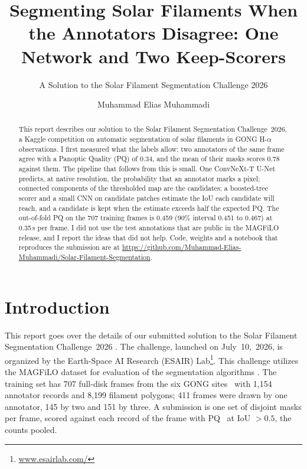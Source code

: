 \documentclass[sigconf]{acmart}
\begin{document}
\title[One Network and Two Keep-Scorers]{Segmenting Solar Filaments When the Annotators Disagree: One Network and Two Keep-Scorers}
\subtitle{A Solution to the Solar Filament Segmentation Challenge 2026} %

\author{Muhammad Elias Muhammadi}

\begin{abstract}
    This report describes our solution to the Solar Filament Segmentation Challenge~2026, a Kaggle competition on automatic segmentation of solar filaments in GONG H-$\alpha$ observations.
    I first measured what the labels allow: two annotators of the same frame agree with a
    Panoptic Quality (PQ) of 0.34, and the mean of their masks scores 0.78 against them. The
    pipeline that follows from this is small. One ConvNeXt-T U-Net predicts, at native resolution,
    the probability that an annotator marks a pixel; connected components of the thresholded map
    are the candidates; a boosted-tree scorer and a small CNN on candidate patches estimate the
    IoU each candidate will reach, and a candidate is kept when the estimate exceeds half the
    expected PQ. The out-of-fold PQ on the 707 training frames is 0.459 (90\% interval 0.451 to
    0.467) at 0.35\,s per frame. I did not use the test annotations that are public in the MAGFiLO
    release, and I report the ideas that did not help. Code, weights and a notebook that reproduces
    the submission are at \url{https://github.com/Muhammad-Elias-Muhammadi/Solar-Filament-Segmentation}.
\end{abstract}

\maketitle

\section{Introduction}
    This report goes over the details of our submitted solution to the Solar Filament Segmentation Challenge~2026 \cite{filament-segmentation-2026}. The challenge, launched on July~10,~2026, is organized by the Earth-Space AI Research (ESAIR) Lab\footnote{\href{https://www.esairlab.com/home}{www.esairlab.com/}}. This challenge utilizes the MAGFiLO dataset for evaluation of the segmentation algorithms \cite{ahmadzadeh2024dataset}.
The training set has 707 full-disk frames from the six GONG sites~\cite{harvey2011} with 1,154
annotator records and 8,199 filament polygons; 411 frames were drawn by one annotator, 145 by two
and 151 by three. A submission is one set of disjoint masks per frame, scored against each record
of the frame with PQ~\cite{kirillov2019} at IoU $>0.5$, the counts pooled.
\end{document}
